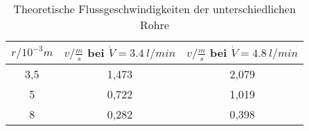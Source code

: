 \begin{table}[h!]
  \centering
  \caption{Theoretische Flussgeschwindigkeiten der unterschiedlichen Rohre}
  \label{tab:theo}
  \begin{tabular}{c c c}
    \toprule
      $r/ 10^{-3}m$  &  $v/ \frac{m}{s}$ bei $\dot{V}=\SI{3,4}{l/min}$   & $v/ \frac{m}{s}$ bei $\dot{V}=\SI{4,8}{l/min}$  \\
      \midrule
    3,5   &   1,473   &   2,079    \\
    5     &   0,722   &   1,019    \\
    8     &   0,282   &   0,398    \\
    \bottomrule
  \end{tabular}
\end{table}

%
